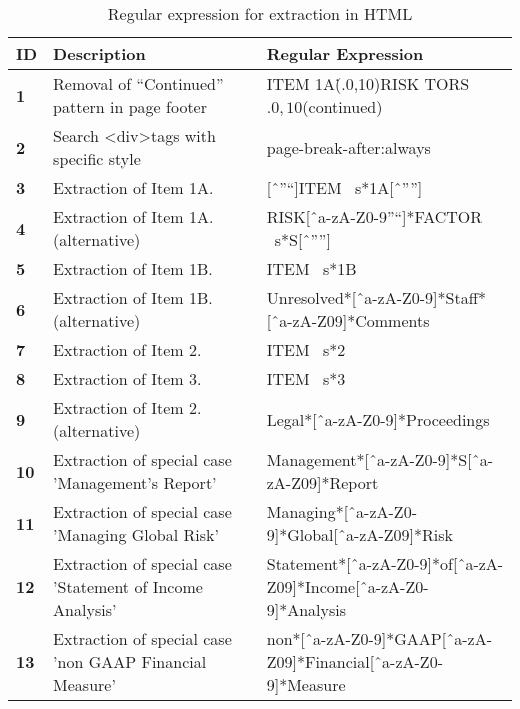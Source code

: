 \documentclass[logo,bsc,singlespacing,parskip]{infthesis}
\begin{document}
\begin{table}[ht]
    \centering
    \begin{tabular}{|m{0.5cm}|m{7cm}|m{7cm}|}
        \hline
        \textbf{ID} & \textbf{Description} & \textbf{Regular Expression} \\
        \hline
        \textbf{1} & {\scriptsize Removal of “Continued” pattern in page footer} & {\scriptsize ITEM 1A\.(.{0,10})RISK TORS\(.{0,10}\)(continued)} \\
        \hline
        \textbf{2} & {\scriptsize Search \textless div\textgreater tags with specific style } & {\scriptsize page-break-after\s*:\s*always } \\
        \hline
        \textbf{3} & {\scriptsize Extraction of Item 1A. } & {\scriptsize [ˆ”“]ITEM \ s*1A[ˆ””]} \\
        \hline
        \textbf{4} & {\scriptsize Extraction of Item 1A. (alternative)} & {\scriptsize RISK[ˆa-zA-Z0-9”“]*FACTOR \ s*S[ˆ””] } \\
        \hline
        \textbf{5} & {\scriptsize Extraction of Item 1B.} & {\scriptsize ITEM \ s*1B} \\
        \hline
        \textbf{6} & {\scriptsize Extraction of Item 1B. (alternative)} & {\scriptsize Unresolved*[ˆa-zA-Z0-9]*Staff*[ˆa-zA-Z09]*Comments} \\
        \hline
        \textbf{7} & {\scriptsize Extraction of Item 2.} & {\scriptsize ITEM \ s*2} \\
        \hline
        \textbf{8} & {\scriptsize Extraction of Item 3.} & {\scriptsize ITEM \ s*3}  \\
        \hline
        \textbf{9} & {\scriptsize Extraction of Item 2. (alternative)} & {\scriptsize Legal*[ˆa-zA-Z0-9]*Proceedings} \\
        \hline
        \textbf{10} & {\scriptsize Extraction of special case ’Management’s Report’} & {\scriptsize Management*[ˆa-zA-Z0-9]*S[ˆa-zA-Z09]*Report} \\
        \hline
        \textbf{11} & {\scriptsize Extraction of special case ’Managing Global Risk’} & {\scriptsize Managing*[ˆa-zA-Z0-9]*Global[ˆa-zA-Z09]*Risk} \\
        \hline
        \textbf{12} & {\scriptsize Extraction of special case ’Statement of Income Analysis’} & {\scriptsize Statement*[ˆa-zA-Z0-9]*of[ˆa-zA-Z09]*Income[ˆa-zA-Z0-9]*Analysis} \\
        \hline
        \textbf{13} & {\scriptsize Extraction of special case ’non GAAP Financial Measure’} & {\scriptsize non*[ˆa-zA-Z0-9]*GAAP[ˆa-zA-Z09]*Financial[ˆa-zA-Z0-9]*Measure} \\
        \hline
    \end{tabular}
    \caption{Regular expression for extraction in HTML}
    \label{tab:rex}
\end{table}
\end{document}
